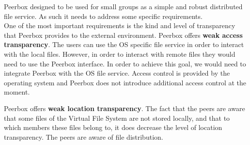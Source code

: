 
Peerbox designed to be used for small groups as a simple and robust distributed file service. As such it needs to address some specific requirements.\\

One of the most important requirements is the kind and level of transparency that Peerbox provides to the external environment. Peerbox offers \textbf{weak access transparency}. The users can use the OS specific file service in order to interact with the local files. However, in order to interact with remote files they would need to use the Peerbox interface. In order to achieve this goal, we would need to integrate Peerbox with the OS file service.  Access control is provided by the operating system and Peerbox does not introduce additional access control at the moment.

Peerbox offers \textbf{weak location transparency}. The fact that the peers are aware that some files of the Virtual File System are not stored locally, and that to which members these files belong to, it does decrease the level of location transparency. The peers are aware of file distribution.




%





 
 






% 





